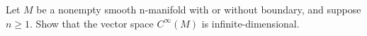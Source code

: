 Let $M$ be a nonempty smooth n-manifold with or without boundary, and suppose $n \geq 1$.  Show that the vector space $C^\infty(M)$ is infinite-dimensional.